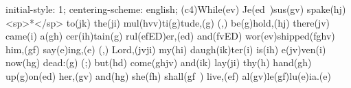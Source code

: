 initial-style: 1;
centering-scheme: english;
(c4)While(ev) Je(ed~)sus(gv) spake(hj) <sp>*</sp> to(jk) the(ji) mul(hvv)ti(g)tude,(g) (,) be(g)hold,(hj) there(jv) came(i) a(gh) cer(ih)tain(g) rul(efED)er,(ed) and(fvED) wor(ev)shipped(fghv) him,(gf) say(e)ing,(e) (,) Lord,(jvji) my(hi) daugh(ik)ter(i) is(ih) e(jv)ven(i) now(hg) dead:(g) (;) but(hd) come(ghjv) and(ik) lay(ji) thy(h) hand(gh) up(g)on(ed) her,(gv) and(hg) she(fh) shall(gf~) live,(ef) al(gv)le(gf)lu(e)ia.(e)
